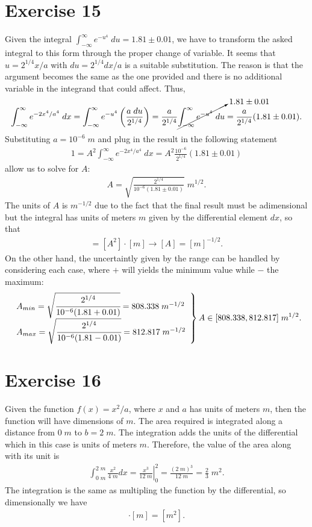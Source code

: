\documentclass[letterpaper,11pt,twoside]{article}
\begin{document}
\section{Exercise 15}
Given the integral $\int_{-\infty}^\infty e^{-u^4}\;du=1.81\pm0.01$, we have to transform the asked integral to this form through
the proper change of variable. It seems that $u=2^{1/4}x/a$ with $du=2^{1/4}dx/a$ is a suitable substitution. The reason is that the argument 
becomes the same as the one provided and there is no additional variable in the integrand that could affect. Thus,
\begin{align*}
  \int^\infty_{-\infty}e^{-2x^4/a^4}\;dx=\int_{-\infty}^\infty e^{-u^4}\left(\frac{a\;du}{2^{1/4}}\right)=\frac{a}{2^{1/4}}\cancelto{1.81\pm0.01}{\int_{-\infty}^{\infty}e^{-u^4}\;du}=\frac{a}{2^{1/4}}(1.81\pm0.01).
\end{align*}
Substituting $a=10^{-6}\;m$ and plug in the result in the following statement
\begin{align*}
  1=A^2\int^\infty_{-\infty}e^{-2x^4/a^4}\;dx=A^2\frac{10^{-6}}{2^{1/4}}(1.81\pm0.01)
\end{align*}
allow us to solve for $A$:
\begin{align*}
  A=\sqrt{\frac{2^{1/4}}{10^{-6}(1.81\pm0.01)}}\;m^{1/2}.
\end{align*}
The units of $A$ is $m^{-1/2}$ due to the fact that the final result must be adimensional but the integral has units of meters $m$ given by the differential
element $dx$, so that
\begin{align*}
  [-]=[A^2]\cdot[m]\longrightarrow [A]=[m]^{-1/2}.
\end{align*}
On the other hand, the uncertaintly given by the range can be handled by considering each case, where $+$ will yields the minimum value while $-$ the maximum:
\begin{align}
  \left.\begin{array}{l}
  A_{min}=\sqrt{\cfrac{2^{1/4}}{10^{-6}(1.81+0.01)}}=808.338\;m^{-1/2}\\
  A_{max}=\sqrt{\cfrac{2^{1/4}}{10^{-6}(1.81-0.01)}}=812.817\;m^{-1/2}
  \end{array}\right\}A\in[808.338,812.817]\;m^{1/2}.
\end{align} 
\section{Exercise 16}
Given the function $f(x)=x^2/a$, where $x$ and $a$ has units of meters $m$, then the function will have dimensions of $m$.
The area required is integrated along a distance from $0\;m$ to $b=2\;m$. The integration adds the units of the differential
which in this case is units of meters $m$. Therefore, the value of the area along with its unit is
\begin{align*}
  \int_{0\;m}^{2\;m}\frac{x^2}{4\;m}dx=\left.\frac{x^3}{12\;m}\right|_0^2=\frac{(2\;m)^3}{12\;m}=\frac{2}{3}\;m^2.
\end{align*}
The integration is the same as multipling the function by the differential, so dimensionally we have
\begin{align*}
  [m]\cdot[m]=[m^2].
\end{align*}
\end{document}
